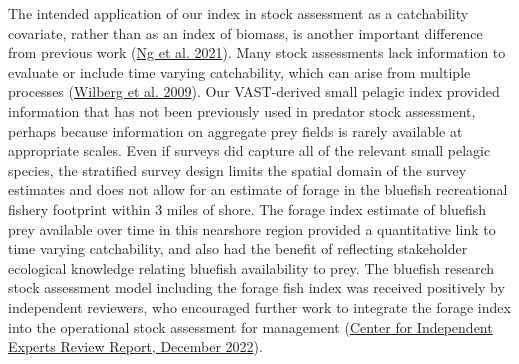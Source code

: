 \documentclass[
]{article}
\begin{document}
The intended application of our index in stock assessment as a catchability covariate, rather than as an index of biomass, is another important difference from previous work (\protect\hyperlink{ref-ng_predator_2021}{Ng et al. 2021}). Many stock assessments lack information to evaluate or include time varying catchability, which can arise from multiple processes (\protect\hyperlink{ref-wilberg_incorporating_2009}{Wilberg et al. 2009}). Our VAST-derived small pelagic index provided information that has not been previously used in predator stock assessment, perhaps because information on aggregate prey fields is rarely available at appropriate scales. Even if surveys did capture all of the relevant small pelagic species, the stratified survey design limits the spatial domain of the survey estimates and does not allow for an estimate of forage in the bluefish recreational fishery footprint within 3 miles of shore. The forage index estimate of bluefish prey available over time in this nearshore region provided a quantitative link to time varying catchability, and also had the benefit of reflecting stakeholder ecological knowledge relating bluefish availability to prey. The bluefish research stock assessment model including the forage fish index was received positively by independent reviewers, who encouraged further work to integrate the forage index into the operational stock assessment for management (\href{https://www.mafmc.org/s/h_Final-review-summary-report_bluefish-and-spiny-dogfish-RT2022_AJD508-gwV2_may2023.pdf}{Center for Independent Experts Review Report, December 2022}).
\end{document}
